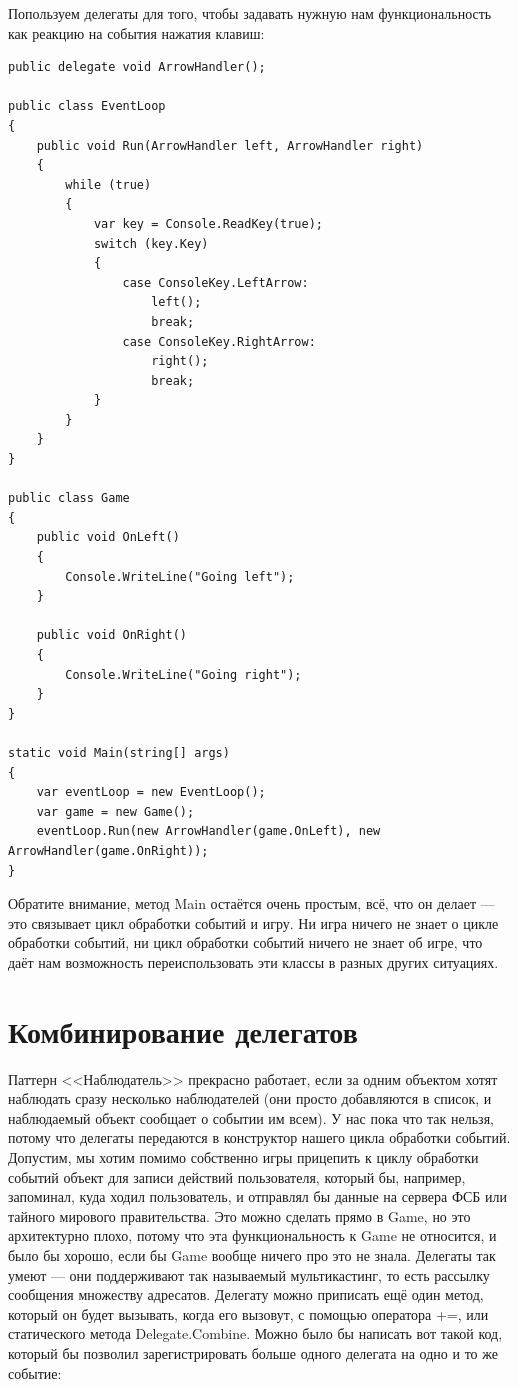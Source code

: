 \documentclass[a5paper]{article}
\begin{document}
Попользуем делегаты для того, чтобы задавать нужную нам функциональность как реакцию на события нажатия клавиш:

\begin{verbatim}
public delegate void ArrowHandler();

public class EventLoop
{
    public void Run(ArrowHandler left, ArrowHandler right)
    {
        while (true)
        {
            var key = Console.ReadKey(true);
            switch (key.Key)
            {
                case ConsoleKey.LeftArrow:
                    left();
                    break;
                case ConsoleKey.RightArrow:
                    right();
                    break;
            }
        }
    }
}

public class Game
{
    public void OnLeft()
    {
        Console.WriteLine("Going left");
    }

    public void OnRight()
    {
        Console.WriteLine("Going right");
    }
}

static void Main(string[] args)
{
    var eventLoop = new EventLoop();
    var game = new Game();
    eventLoop.Run(new ArrowHandler(game.OnLeft), new ArrowHandler(game.OnRight));
}
\end{verbatim}

Обратите внимание, метод Main остаётся очень простым, всё, что он делает --- это связывает цикл обработки событий и игру. Ни игра ничего не знает о цикле обработки событий, ни цикл обработки событий ничего не знает об игре, что даёт нам возможность переиспользовать эти классы в разных других ситуациях.

\section{Комбинирование делегатов}

Паттерн <<Наблюдатель>> прекрасно работает, если за одним объектом хотят наблюдать сразу несколько наблюдателей (они просто добавляются в список, и наблюдаемый объект сообщает о событии им всем). У нас пока что так нельзя, потому что делегаты передаются в конструктор нашего цикла обработки событий. Допустим, мы хотим помимо собственно игры прицепить к циклу обработки событий объект для записи действий пользователя, который бы, например, запоминал, куда ходил пользователь, и отправлял бы данные на сервера ФСБ или тайного мирового правительства. Это можно сделать прямо в Game, но это архитектурно плохо, потому что эта функциональность к Game не относится, и было бы хорошо, если бы Game вообще ничего про это не знала. Делегаты так умеют --- они поддерживают так называемый мультикастинг, то есть рассылку сообщения множеству адресатов. Делегату можно приписать ещё один метод, который он будет вызывать, когда его вызовут, с помощью оператора +=, или статического метода Delegate.Combine. Можно было бы написать вот такой код, который бы позволил зарегистрировать больше одного делегата на одно и то же событие:
\end{document}
